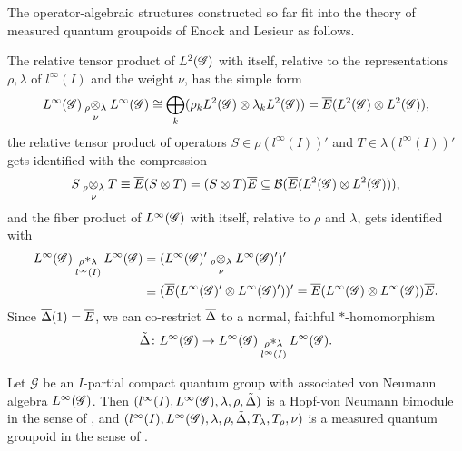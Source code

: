 The operator-algebraic structures constructed so far fit into the
theory of measured quantum groupoids of Enock and Lesieur \cite{Eno2,Les1} as follows.

The relative tensor product of $L^{2}(\mathscr{G})$ with itself, relative to the
representations $\rho,\lambda$ of $l^{\infty}(I)$ and the weight
$\nu$, has the simple form
\begin{align*}
L^{\infty}(\mathscr{G}) \underset{\nu{}}{_{\rho}\otimes_{\lambda}} L^{\infty}(\mathscr{G}) \cong
  \bigoplus_{k} (\rho_{k}L^{2}(\mathscr{G}) \otimes \lambda_{k}L^{2}(\mathscr{G})) =
  \overline{E}(L^{2}(\mathscr{G}) \otimes L^{2}(\mathscr{G})),
\end{align*}
the relative tensor product of operators $S\in \rho(l^{\infty}(I))'$
and $T \in \lambda(l^{\infty}(I))'$ gets identified with the
compression
\begin{align*}
S \underset{\nu{}}{_{\rho}\otimes_{\lambda}} T \equiv
  \overline{E}(S \otimes
  T) = (S \otimes T)\overline{E} \subseteq {\cal B}(\overline{E}(L^{2}(\mathscr{G})
  \otimes L^{2}(\mathscr{G}))),
\end{align*}
and the fiber product of  $  L^{\infty}(\mathscr{G})$ with itself, relative to $\rho$
and $\lambda$,  gets identified with
\begin{align} \label{eq:vn-fiber}
  \begin{aligned}
    L^{\infty}(\mathscr{G}) \underset{l^{\infty}(I)}{_{\rho}\ast_{\lambda}} L^{\infty}(\mathscr{G}) &= (L^{\infty}(\mathscr{G})' \underset{\nu{}}{_{\rho}\otimes_{\lambda}} L^{\infty}(\mathscr{G})')' \\ &\equiv
    (\overline{E}(L^{\infty}(\mathscr{G})' \otimes L^{\infty}(\mathscr{G})'))' = \overline{E}(L^{\infty}(\mathscr{G}) \otimes
    L^{\infty}(\mathscr{G}))\overline{E}.
  \end{aligned}
\end{align} 
Since $\overline{\Delta}(1)=\overline{E}$, we can co-restrict $\overline{\Delta}$ to  a
normal, faithful $*$-homomorphism
\begin{align*}
  \tilde\Delta \colon L^{\infty}(\mathscr{G}) \to   L^{\infty}(\mathscr{G}) \underset{l^{\infty}(I)}{_{\rho}\ast_{\lambda}} L^{\infty}(\mathscr{G}).
\end{align*}
\begin{Theorem}
  Let $\mathscr{G}$ be an $I$-partial compact quantum group with
  associated von Neumann algebra $L^{\infty}(\mathscr{G})$.  Then
  $(l^{\infty}(I),L^{\infty}(\mathscr{G}), \lambda,\rho,\tilde\Delta)$ is a Hopf-von
  Neumann bimodule in the sense of  \cite{Val1}, and
  $(l^{\infty}(I),L^{\infty}(\mathscr{G}), \lambda,\rho,\tilde\Delta,
  T_{\lambda},T_{\rho},\nu)$ is a measured quantum groupoid in the
  sense of \cite{Eno2}.
\end{Theorem}
